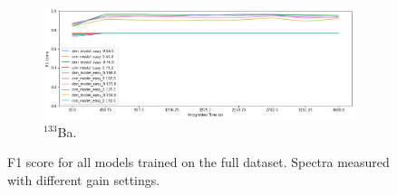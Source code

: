 \begin{figure}[H]
     \begin{subfigure}[b]{0.9\textwidth}
         \centering
         \includegraphics[width=\textwidth]{images/results_easy_distance_comparison}
         \caption{$^{133}$Ba.}
         \label{fig:results_easy_distance_comparison_full}
     \end{subfigure}

        \caption{F1 score for all models trained on the full dataset. Spectra measured with different gain settings.}
        \label{fig:results_easy_distance_comparison}
\end{figure}


